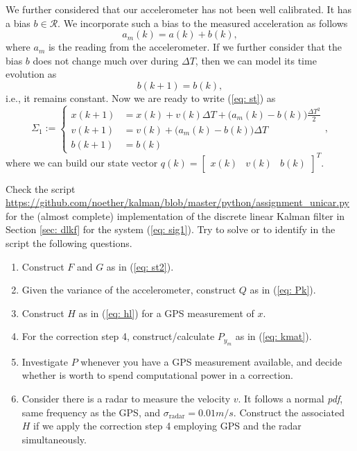 \documentclass[11pt,a4paper]{article}
\begin{document}
We further considered that our accelerometer has not been well calibrated. It has a bias $b\in\mathcal{R}$. We incorporate such a bias to the measured acceleration as follows
\begin{equation}
	a_m(k) = a(k) + b(k),
	\label{eq: am}
\end{equation}
where $a_m$ is the reading from the accelerometer. If we further consider that the bias $b$ does not change much over during $\Delta T$, then we can model its time evolution as
\begin{equation}
	b(k+1) = b(k),
\end{equation}
i.e., it remains constant. Now we are ready to write (\ref{eq: st}) as
\begin{equation}
	\Sigma_1 := \begin{cases}
		x(k+1) &= x(k) + v(k)\Delta T + \big(a_m(k) - b(k)\big) \frac{\Delta T^2}{2} \\
		v(k+1) &= v(k) + \big(a_m(k) - b(k)\big)\Delta T \\
		b(k+1) &= b(k)
	\end{cases},\label{eq: sig1}
\end{equation}
where we can build our state vector $q(k) = \begin{bmatrix}x(k) & v(k) & b(k)\end{bmatrix}^T$.

Check the script \url{https://github.com/noether/kalman/blob/master/python/assignment_unicar.py} for the (almost complete) implementation of the discrete linear Kalman filter in Section \ref{sec: dlkf} for the system (\ref{eq: sig1}). Try to solve or to identify in the script the following questions.

\begin{enumerate}
	\item Construct $F$ and $G$ as in (\ref{eq: st2}).
	\item Given the variance of the accelerometer, construct $Q$ as in (\ref{eq: Pk}).
	\item Construct $H$ as in (\ref{eq: hl}) for a GPS measurement of $x$.
	\item For the correction step 4, construct/calculate $P_{y_m}$ as in (\ref{eq: kmat}).
	\item Investigate $P$ whenever you have a GPS measurement available, and decide whether is worth to spend computational power in a correction.
	\item Consider there is a radar to measure the velocity $v$. It follows a normal \emph{pdf}, same frequency as the GPS, and $\sigma_{\text{radar}} = 0.01 m/s$. Construct the associated $H$ if we apply the correction step 4 employing GPS and the radar simultaneously.
\end{enumerate}
\end{document}
